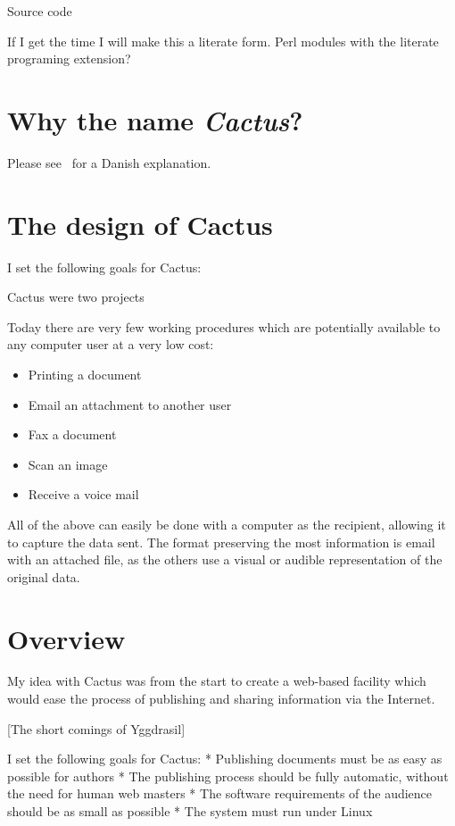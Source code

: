 Source code

If I get the time I will make this a literate form. Perl
modules with the literate programing extension?


\section{Why the name \textit{Cactus}?}

Please see~ for a Danish explanation.



\section{The design of Cactus}
\label{sec:the-design-of-cactus}

I set the following goals for Cactus:

Cactus were two projects

Today there are very few working procedures which are
potentially available to any computer user at a very low
cost:

\begin{itemize}
\item Printing a document
\item Email an attachment to another user
\item Fax a document
\item Scan an image
\item Receive a voice mail
\end{itemize}

All of the above can easily be done with a computer as the
recipient, allowing it to capture the data sent.  The format
preserving the most information is email with an attached
file, as the others use a visual or audible representation
of the original data.




\section{Overview}

My idea with Cactus was from the start to create a web-based
facility which would ease the process of publishing and
sharing information via the Internet.

[The short comings of Yggdrasil]

I set the following goals for Cactus: * Publishing documents
must be as easy as possible for authors * The publishing
process should be fully automatic, without the need for
human web masters * The software requirements of the
audience should be as small as possible * The system must
run under Linux

